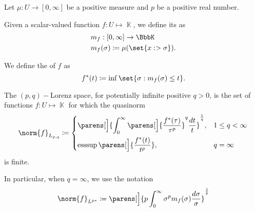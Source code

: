 \begin{definition}\label{def:distribution_function}
  Let \( \mu: U \to [0, \infty] \) be a positive measure and \( p \) be a positive real number.

  \begin{thmenum}
     Given a scalar-valued function \( f: U \mapsto \BbbK \), we define its  as
    \begin{align*}
      &m_f: [0, \infty] \to \BbbK \\
      &m_f(\sigma) \coloneqq \mu(\set{ x :  > \sigma }).
    \end{align*}

     We define the  of \( f \) as
    \begin{equation*}
      f^*(t) \coloneqq \inf\set{ \sigma : m_f(\sigma) \leq t }.
    \end{equation*}

     The \( (p, q)-\)Lorenz space, for potentially infinite positive \( q > 0 \), is the set of functions \( f: U \mapsto \BbbK \) for which the quasinorm
    \begin{equation*}
      \norm{f}_{L_{p,q}} \coloneqq \begin{dcases}
        \parens[\Big]{\int_0^\infty \parens[\Big]{\frac {f^*(\tau)} {\tau^p}}^q \frac {d t} t}^{\frac 1 q}, &1 \leq q < \infty \\
        \ess\sup\parens[\Big]{\frac {f^*(t)} {t^p}}, &q = \infty
      \end{dcases}
    \end{equation*}
    is finite.

    In particular, when \( q = \infty \), we use the notation
    \begin{equation*}
      \norm{f}_{L^{p*}} \coloneqq \parens[\Big]{p \int_0^\infty \sigma^p m_f(\sigma) \frac {d \sigma} \sigma}^{\frac 1 p}
    \end{equation*}
  \end{thmenum}
\end{definition}

